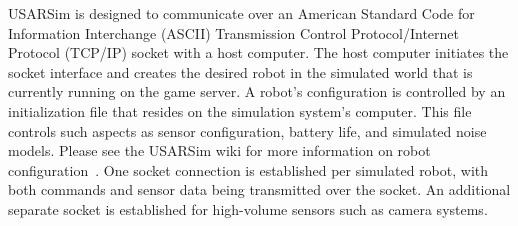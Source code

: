 USARSim is designed to communicate over an American Standard Code for Information Interchange (ASCII) Transmission Control Protocol/Internet Protocol (TCP/IP) socket with a host computer. The host computer initiates the socket interface and creates the desired robot in the simulated world that is currently running on the game server. A robot's configuration is controlled by an initialization file that resides on the simulation system's computer. This file controls such aspects as sensor configuration, battery life, and simulated noise models. Please see the USARSim wiki for more information on robot configuration~\cite{USARSimWeb}.  One socket connection is established per simulated robot, with both commands and sensor data being transmitted over the socket. An additional separate socket is established for high-volume sensors such as camera systems.

